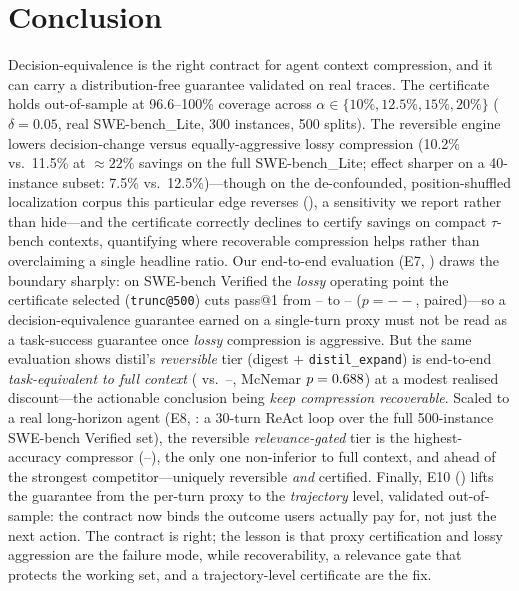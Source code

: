 \documentclass[11pt]{article}
\newcommand{\sweEsevenFullPass}{--}\newcommand{\sweEsevenFullResolved}{--}%
\newcommand{\sweEsevenDistilPass}{--}\newcommand{\sweEsevenDistilResolved}{--}%
\newcommand{\sweEsevenDistilVsFullP}{--}\newcommand{\sweEsevenLinguaVsFullP}{--}%
\newcommand{\sweEeightGatedPass}{--}\newcommand{\sweEeightGatedResolved}{--}%
\begin{document}
\section{Conclusion}
Decision-equivalence is the right contract for agent context compression, and it can
carry a distribution-free guarantee validated on real traces. The certificate
holds out-of-sample at 96.6--100\% coverage across $\alpha \in \{10\%, 12.5\%, 15\%,
20\%\}$ ($\delta=0.05$, real SWE-bench\_Lite, 300 instances, 500 splits). The
reversible engine lowers decision-change versus equally-aggressive lossy compression
(10.2\% vs.\ 11.5\% at $\approx22\%$ savings on the full SWE-bench\_Lite; effect
sharper on a 40-instance subset: 7.5\% vs.\ 12.5\%)---though on the de-confounded,
position-shuffled localization corpus this particular edge reverses
(), a sensitivity we report rather than hide---and the certificate
correctly declines to certify savings on compact $\tau$-bench contexts, quantifying
where recoverable compression helps rather than overclaiming a single headline ratio.
Our end-to-end evaluation (E7, ) draws the boundary sharply: on
SWE-bench Verified the \emph{lossy} operating point the certificate selected
(\texttt{trunc@500}) cuts pass@1 from \sweEsevenFullPass{} to \sweEsevenDistilPass{}
($p=\sweEsevenDistilVsFullP{}$, paired)---so a decision-equivalence guarantee earned on a
single-turn proxy must not be read as a task-success guarantee once \emph{lossy}
compression is aggressive. But the same evaluation shows distil's \emph{reversible} tier
(digest $+$ \texttt{distil\_expand}) is end-to-end \emph{task-equivalent to full context}
(\sweEsevenExpandPass{} vs.\ \sweEsevenFullPass{}, McNemar $p=0.688{}$)
at a modest realised discount---the actionable conclusion being \emph{keep compression
recoverable}. Scaled to a real long-horizon agent (E8, : a 30-turn ReAct loop
over the full 500-instance SWE-bench Verified set), the reversible \emph{relevance-gated} tier
is the highest-accuracy compressor (\sweEeightGatedPass{}), the only one non-inferior to full
context, and ahead of the strongest competitor---uniquely reversible \emph{and} certified.
Finally, E10 () lifts the guarantee from the per-turn proxy to the
\emph{trajectory} level, validated out-of-sample: the contract now binds the outcome users
actually pay for, not just the next action. The contract is right; the lesson is that proxy
certification and lossy aggression are the failure mode, while recoverability, a relevance gate
that protects the working set, and a trajectory-level certificate are the fix.
\end{document}
